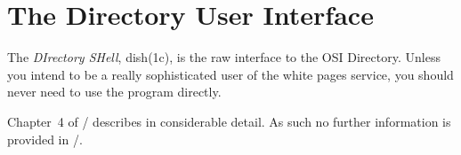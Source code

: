 
\chapter	{The Directory User Interface}
The {\em DIrectory SHell},
\man dish(1c),
is the raw interface to the OSI Directory.
Unless you intend to be a really sophisticated user of the white pages service,
you should never need to use the  program directly.

Chapter~4 of \volfive/ describes  in considerable detail.
As such no further information is provided in \thebook/.
